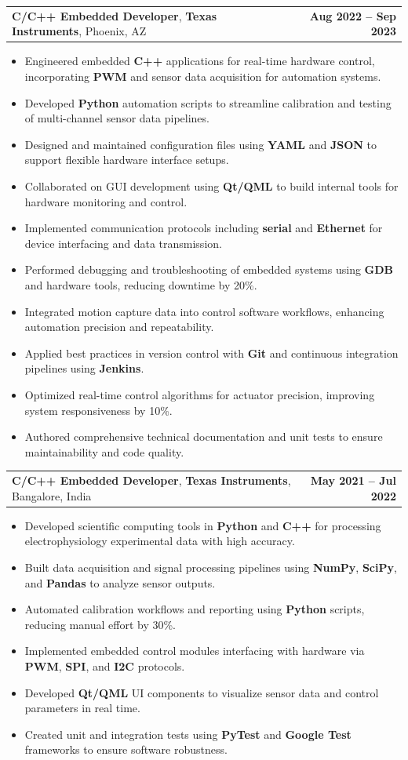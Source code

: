 \documentclass[letterpaper,11pt]{article}
\makeatletter
\newcommand{\resumeItem}[1]{
  \item\footnotesize{
    {#1 \vspace{-2pt}}
  }
}
\newcommand{\resumeSubheading}[4]{
  \vspace{-2pt}\item
    \begin{tabular*}{1.0\textwidth}[t]{l@{\extracolsep{\fill}}r}
      \textbf{\fontsize{10pt}{14pt}\selectfont #3}, \textbf{\fontsize{10pt}{14pt}\selectfont #1}, \fontsize{10pt}{14pt}\selectfont #4 & \textbf{\fontsize{10pt}{14pt}\selectfont #2} \\
    \end{tabular*}\vspace{-7pt}
}
\newcommand{\resumeItemListStart}{\begin{itemize}[leftmargin=*]}
\newcommand{\resumeItemListEnd}{\end{itemize}\vspace{-5pt}}
\makeatother
\begin{document}
    \resumeSubheading
        {Texas Instruments}{Aug 2022 -- Sep 2023}
        {C/C++ Embedded Developer}{Phoenix, AZ}
      \resumeItemListStart
        \resumeItem{Engineered embedded \textbf{C++} applications for real-time hardware control, incorporating \textbf{PWM} and sensor data acquisition for automation systems.}
        \resumeItem{Developed \textbf{Python} automation scripts to streamline calibration and testing of multi-channel sensor data pipelines.}
        \resumeItem{Designed and maintained configuration files using \textbf{YAML} and \textbf{JSON} to support flexible hardware interface setups.}
        \resumeItem{Collaborated on GUI development using \textbf{Qt/QML} to build internal tools for hardware monitoring and control.}
        \resumeItem{Implemented communication protocols including \textbf{serial} and \textbf{Ethernet} for device interfacing and data transmission.}
        \resumeItem{Performed debugging and troubleshooting of embedded systems using \textbf{GDB} and hardware tools, reducing downtime by 20\%.}
        \resumeItem{Integrated motion capture data into control software workflows, enhancing automation precision and repeatability.}
        \resumeItem{Applied best practices in version control with \textbf{Git} and continuous integration pipelines using \textbf{Jenkins}.}
        \resumeItem{Optimized real-time control algorithms for actuator precision, improving system responsiveness by 10\%.}
        \resumeItem{Authored comprehensive technical documentation and unit tests to ensure maintainability and code quality.}
      \resumeItemListEnd

    \resumeSubheading
        {Texas Instruments}{May 2021 -- Jul 2022}
        {C/C++ Embedded Developer}{Bangalore, India}
      \resumeItemListStart
        \resumeItem{Developed scientific computing tools in \textbf{Python} and \textbf{C++} for processing electrophysiology experimental data with high accuracy.}
        \resumeItem{Built data acquisition and signal processing pipelines using \textbf{NumPy}, \textbf{SciPy}, and \textbf{Pandas} to analyze sensor outputs.}
        \resumeItem{Automated calibration workflows and reporting using \textbf{Python} scripts, reducing manual effort by 30\%.}
        \resumeItem{Implemented embedded control modules interfacing with hardware via \textbf{PWM}, \textbf{SPI}, and \textbf{I2C} protocols.}
        \resumeItem{Developed \textbf{Qt/QML} UI components to visualize sensor data and control parameters in real time.}
        \resumeItem{Created unit and integration tests using \textbf{PyTest} and \textbf{Google Test} frameworks to ensure software robustness.}
      \resumeItemListEnd
\end{document}
